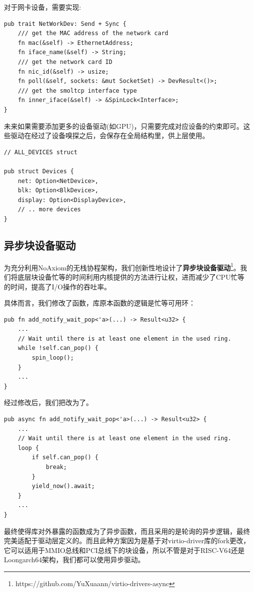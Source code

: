 \documentclass{article}
\begin{document}
对于网卡设备，需要实现:
\begin{lstlisting}
pub trait NetWorkDev: Send + Sync {
    /// get the MAC address of the network card
    fn mac(&self) -> EthernetAddress;
    fn iface_name(&self) -> String;
    /// get the network card ID
    fn nic_id(&self) -> usize;
    fn poll(&self, sockets: &mut SocketSet) -> DevResult<()>;
    /// get the smoltcp interface type
    fn inner_iface(&self) -> &SpinLock<Interface>;
}
\end{lstlisting}

未来如果需要添加更多的设备驱动(如GPU)，只需要完成对应设备的约束即可。这些驱动在经过了设备嗅探之后，会保存在全局结构里，供上层使用。

\begin{lstlisting}
// ALL_DEVICES struct

pub struct Devices {
    net: Option<NetDevice>,
    blk: Option<BlkDevice>,
    display: Option<DisplayDevice>,
    // .. more devices
}
\end{lstlisting}

\subsection{异步块设备驱动}

为充分利用NoAxiom的无栈协程架构，我们创新性地设计了\textbf{异步块设备驱动}\footnote{https://github.com/YuXuaann/virtio-drivers-async}。我们将底层块设备忙等的时间利用内核提供的方法进行让权，进而减少了CPU忙等的时间，提高了I/O操作的吞吐率。

具体而言，我们修改了函数，库原本函数的逻辑是忙等可用环：
\begin{lstlisting}
pub fn add_notify_wait_pop<'a>(...) -> Result<u32> {
    ...
    // Wait until there is at least one element in the used ring.
    while !self.can_pop() {
        spin_loop();
    }
    ...
}
\end{lstlisting}
经过修改后，我们把改为了。
\begin{lstlisting}
pub async fn add_notify_wait_pop<'a>(...) -> Result<u32> {
    ...
    // Wait until there is at least one element in the used ring.
    loop {
        if self.can_pop() {
            break;
        }
        yield_now().await;
    }
    ...
}
\end{lstlisting}
最终使得库对外暴露的函数成为了异步函数，而且采用的是轮询的异步逻辑，最终完美适配于驱动层定义的。而且此种方案因为是基于对virtio-driver库的fork更改，它可以适用于MMIO总线和PCI总线下的块设备，所以不管是对于RISC-V64还是Loongarch64架构，我们都可以使用异步驱动。
\end{document}
